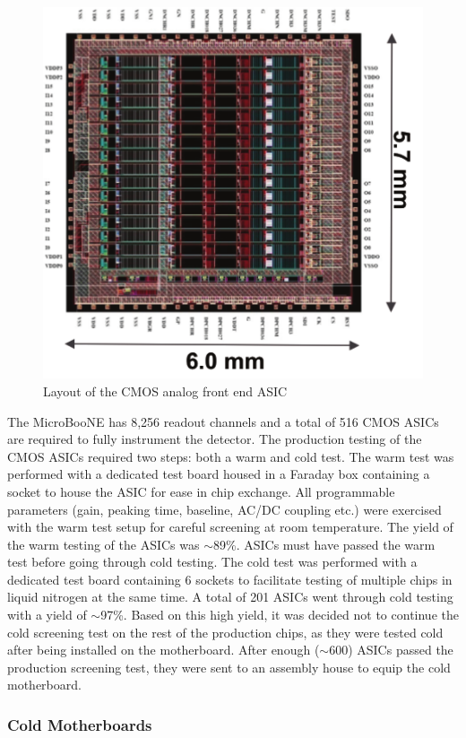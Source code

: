 \begin{figure}[hbt]
\centering
\includegraphics[width=0.75\linewidth]{figures/asic.pdf}
\caption{\label{fig:figasic}Layout of the CMOS analog front end ASIC}
\end{figure}


The MicroBooNE \lartpc has  8,256 readout channels and a total of 516 CMOS ASICs are required to fully instrument the detector. The production testing of the CMOS ASICs required two steps: both a warm and cold test. The warm test was performed with a dedicated test board housed in a Faraday box containing a socket to house the ASIC for ease in chip exchange. All programmable parameters (gain, peaking time, baseline, AC/DC coupling etc.) were exercised with the warm test setup for careful screening at room temperature. The yield of the warm testing of the ASICs was $\sim$89\%. ASICs must have passed the warm test before going through cold testing. The cold test was performed with a dedicated test board containing 6 sockets to facilitate testing of multiple chips in liquid nitrogen at the same time. A total of 201 ASICs went through cold testing with a yield of $\sim$97\%. Based on this high yield, it was decided not to continue the cold screening test on the rest of the production chips, as they were tested cold after being installed on the motherboard. After enough ($\sim$600) ASICs passed the production screening test, they were sent to an assembly house to equip the cold motherboard.



\subsubsection{Cold Motherboards}

